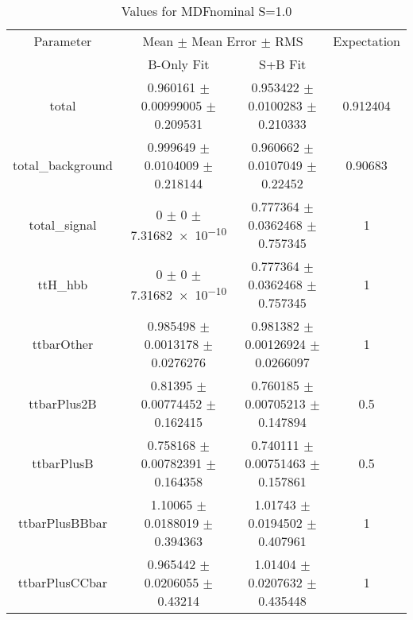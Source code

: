 \begin{table}
\centering
\caption{Values for MDFnominal S=1.0}
\begin{tabular}{cccc}
\toprule
Parameter & \multicolumn{2}{c}{Mean $\pm$ Mean Error $\pm$ RMS} & Expectation\\
 & B-Only Fit & S+B Fit & \\
\midrule
total & \num{0.960161} $\pm$ \num{0.00999005} $\pm$ \num{0.209531} & \num{0.953422} $\pm$ \num{0.0100283} $\pm$ \num{0.210333} & \num{0.912404}\\
total\_background & \num{0.999649} $\pm$ \num{0.0104009} $\pm$ \num{0.218144} & \num{0.960662} $\pm$ \num{0.0107049} $\pm$ \num{0.22452} & \num{0.90683}\\
total\_signal & \num{0} $\pm$ \num{0} $\pm$ \num{7.31682e-10} & \num{0.777364} $\pm$ \num{0.0362468} $\pm$ \num{0.757345} & \num{1}\\
ttH\_hbb & \num{0} $\pm$ \num{0} $\pm$ \num{7.31682e-10} & \num{0.777364} $\pm$ \num{0.0362468} $\pm$ \num{0.757345} & \num{1}\\
ttbarOther & \num{0.985498} $\pm$ \num{0.0013178} $\pm$ \num{0.0276276} & \num{0.981382} $\pm$ \num{0.00126924} $\pm$ \num{0.0266097} & \num{1}\\
ttbarPlus2B & \num{0.81395} $\pm$ \num{0.00774452} $\pm$ \num{0.162415} & \num{0.760185} $\pm$ \num{0.00705213} $\pm$ \num{0.147894} & \num{0.5}\\
ttbarPlusB & \num{0.758168} $\pm$ \num{0.00782391} $\pm$ \num{0.164358} & \num{0.740111} $\pm$ \num{0.00751463} $\pm$ \num{0.157861} & \num{0.5}\\
ttbarPlusBBbar & \num{1.10065} $\pm$ \num{0.0188019} $\pm$ \num{0.394363} & \num{1.01743} $\pm$ \num{0.0194502} $\pm$ \num{0.407961} & \num{1}\\
ttbarPlusCCbar & \num{0.965442} $\pm$ \num{0.0206055} $\pm$ \num{0.43214} & \num{1.01404} $\pm$ \num{0.0207632} $\pm$ \num{0.435448} & \num{1}\\
\bottomrule
\end{tabular}
\end{table}